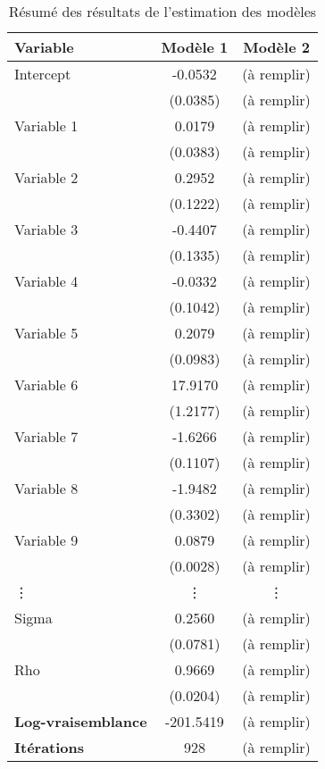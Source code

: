 \begin{table}[ht]
\centering
\caption{Résumé des résultats de l'estimation des modèles}
\label{tab:results}
\begin{tabular}{lcc}
\toprule
\textbf{Variable} & \textbf{Modèle 1} & \textbf{Modèle 2} \\
\midrule
Intercept & -0.0532 & (à remplir) \\
          & (0.0385) & (à remplir) \\[6pt]
Variable 1 & 0.0179 & (à remplir) \\
           & (0.0383) & (à remplir) \\[6pt]
Variable 2 & 0.2952 & (à remplir) \\
           & (0.1222) & (à remplir) \\[6pt]
Variable 3 & -0.4407 & (à remplir) \\
           & (0.1335) & (à remplir) \\[6pt]
Variable 4 & -0.0332 & (à remplir) \\
           & (0.1042) & (à remplir) \\[6pt]
Variable 5 & 0.2079 & (à remplir) \\
           & (0.0983) & (à remplir) \\[6pt]
Variable 6 & 17.9170 & (à remplir) \\
           & (1.2177) & (à remplir) \\[6pt]
Variable 7 & -1.6266 & (à remplir) \\
           & (0.1107) & (à remplir) \\[6pt]
Variable 8 & -1.9482 & (à remplir) \\
           & (0.3302) & (à remplir) \\[6pt]
Variable 9 & 0.0879 & (à remplir) \\
           & (0.0028) & (à remplir) \\[6pt]
\vdots     & \vdots & \vdots \\[6pt]
Sigma      & 0.2560 & (à remplir) \\
           & (0.0781) & (à remplir) \\[6pt]
Rho        & 0.9669 & (à remplir) \\
           & (0.0204) & (à remplir) \\
\midrule
\textbf{Log-vraisemblance} & -201.5419 & (à remplir) \\
\textbf{Itérations} & 928 & (à remplir) \\
\bottomrule
\end{tabular}
\end{table}
